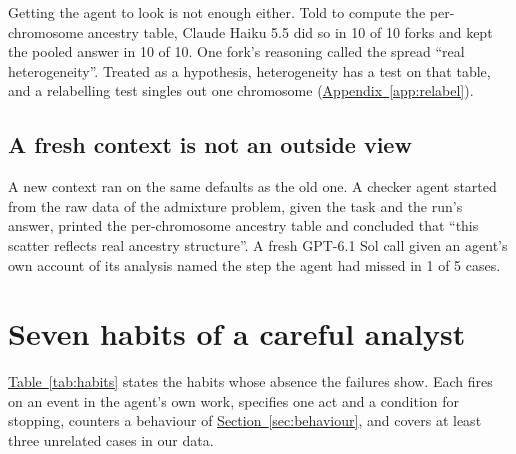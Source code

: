 \documentclass[10pt]{article}
\newcommand{\tabref}[1]{\hyperref[#1]{Table~\ref*{#1}}}
\newcommand{\sref}[1]{\hyperref[#1]{Section~\ref*{#1}}}
\newcommand{\aref}[1]{\hyperref[#1]{Appendix~\ref*{#1}}}
\begin{document}
Getting the agent to look is not enough either. Told to compute the per-chromosome ancestry table, Claude Haiku 5.5 did so in 10 of 10 forks
and kept the pooled answer in 10 of 10. One fork's reasoning called the spread ``real heterogeneity''. Treated as a hypothesis, heterogeneity
has a test on that table, and a relabelling test singles out one chromosome (\aref{app:relabel}).

\subsection{A fresh context is not an outside view}
A new context ran on the same defaults as the old one. A checker agent started from the raw data of the admixture problem, given the task and the
run's answer, printed the per-chromosome ancestry table and concluded that ``this scatter reflects real ancestry structure''. A fresh GPT-6.1 Sol call
given an agent's own account of its analysis named the step the agent had missed in 1 of 5 cases.

\section{Seven habits of a careful analyst}\label{sec:habits}

\tabref{tab:habits} states the habits whose absence the failures show. Each fires on an event in the agent's own work, specifies one act and a
condition for stopping, counters a behaviour of \sref{sec:behaviour}, and covers at least three unrelated cases in our data.
\end{document}
